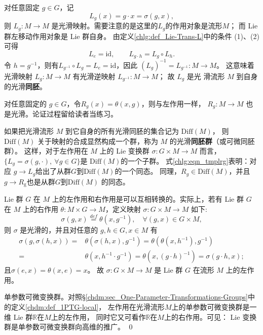 对任意固定 $g \in G$，记
\begin{equation}
    L_g(x)=g \cdot x=\sigma( g,x),
\end{equation}
则 $L_g: M \rightarrow M$ 是光滑映射。需要注意的是这里的$L_g$的作用对象是流形$M$；
而 Lie 群左移动作用对象是 Lie 群自身。
由定义\ref{chlg:def_Lie-Trans-L}中的条件 (1)、(2) 可得
\begin{equation}\label{chlg:eqn_tmplrg}
    L_e  =\mathrm{id}, \qquad
    L_{g \cdot h}  =L_g \circ L_h .
\end{equation}
令 $h=g^{-1}$，则有$L_{g^{-1}} \circ L_{g}=L_{e}=\mathrm{id} $，因此
$(L_{g})^{-1}=L_{g^{-1}}: M \to M $。
这意味着光滑映射 $L_{g}: M \to M$ 有光滑逆映射 $L_{g^{-1}}: M \to M$； 
故 $L_{g}$ 是光 滑流形 $M$ 到自身的光滑\textbf{同胚}。

对任意固定的 $g \in G$，令$R_g(x)=\theta(x,g)$，则与左作用一样，
$R_g: M \to M$ 也是光滑。论证过程留给读者当练习。

如果把光滑流形 $M$ 到它自身的所有光滑同胚的集合记为 $\mathrm{Diff}(M)$，
则 $\mathrm{Diff}(M)$ 关于映射的合成显然构成一个群，称为 $M$ 的光滑\textbf{同胚群}（或可微同胚群）。
这样，对于左作用在 $M$ 上的 Lie 变换群 $\sigma: G \times M \to M$ 而言，
$\{L_g=\sigma(g,\cdot),\ \forall g \in G\}$是 $\mathrm{Diff}(M)$的一个子群。
式\eqref{chlg:eqn_tmplrg}表明：对应 $g \to L_{g}$给出了从群$G$到$\mathrm{Diff}(M)$的一个同态。
同理，$R_g \in \mathrm{Diff}(M)$，并且 $g \to R_{\mathrm{g}}$也是从群$G$到$\mathrm{Diff}(M)$ 的同态。




 Lie 群 $G$ 在 $M$ 上的左作用和右作用是可以互相转换的。实际上，若有 Lie 群 $G$ 在 $M$ 
上的右作用 $\theta: M \times G \to M$，定义映射 $\sigma: G \times M \to M$ 如下:
\begin{equation}
    \sigma(g, x)\overset{def}{=} \theta(x, g^{-1}), \quad \forall(g, x) \in G \times M,
\end{equation}
则 $\sigma$ 是光滑的，并且对任意的 $g, h \in G, x \in M$ 有
\begin{align*}
    \sigma(g, \sigma(h, x))=&\theta\left(\sigma(h, x), g^{-1}\right) 
    =  \theta\left(\theta\left(x, h^{-1}\right), g^{-1}\right) \\
    =& \theta\left(x, h^{-1} \cdot g^{-1}\right) 
    = \theta\left(x,(g \cdot h)^{-1}\right)=\sigma(g \cdot h, x) ;
\end{align*}
且$\sigma(e, x)=\theta(x, e)=x$。
故 $\sigma: G \times M \rightarrow M$ 是 Lie 群 $G$ 在流形 $M$ 上的左作用。


\begin{example}
    单参数可微变换群。对照\S\ref{chdm:sec_One-Parameter-Transformations-Groups}中的定义\ref{chdm:def_1PTG-local}，
    左作用在光滑流形$M$上的单参数可微变换群是一维 Lie 群$\mathbb{R}$在$M$上的左作用，
    同时它又可看作$\mathbb{R}$在$M$上的右作用。可见：
     Lie 变换群是单参数可微变换群向高维的推广。 \qed
\end{example}

